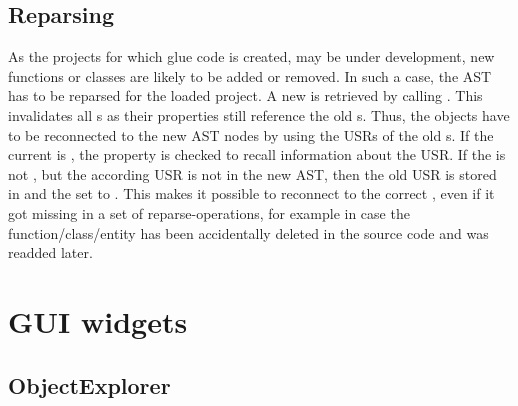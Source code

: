 \subsection{Reparsing}

As the  projects for which glue code is created, may be under development, new functions or classes are likely to be added or removed. In such a case, the  AST has to be reparsed for the loaded project. A new  is retrieved by calling . This invalidates all s as their  properties still reference the old s. Thus, the objects have to be reconnected to the new AST nodes by using the USRs of the old s. If the current  is , the  property is checked to recall information about the USR. If the  is not , but the according USR is not in the new AST, then the old USR is stored in  and the  set to . This makes it possible to reconnect to the correct , even if it got missing in a set of reparse-operations, for example in case the  function/class/entity has been accidentally deleted in the source code and was readded later.

\section{GUI widgets}

\subsection{ObjectExplorer}
\label{sec:ObjectExplorer}

